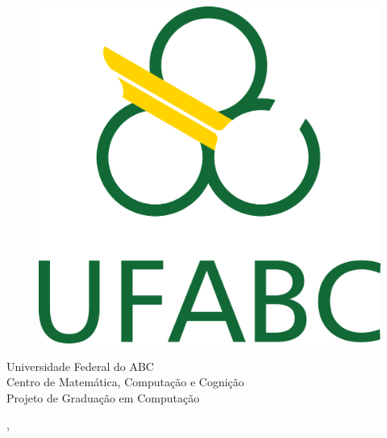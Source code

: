   \begin{capa}%
    \begin{figure}[h!]%
        \centering%
        \includegraphics[scale=1.2]{figs/logo.png}%
    \end{figure}%
    \center
	\ABNTEXchapterfont\large{Universidade Federal do ABC \\ Centro de Matemática, Computação e Cognição \\ Projeto de Graduação em Computação}

    \vfill
    \ABNTEXchapterfont\bfseries\LARGE\imprimirtitulo
    \vfill

	\ABNTEXchapterfont\large\imprimirautor
	\vfill
%
	
    \large\imprimirlocal, \large\imprimirdata

    \vspace*{1cm}
  \end{capa}
